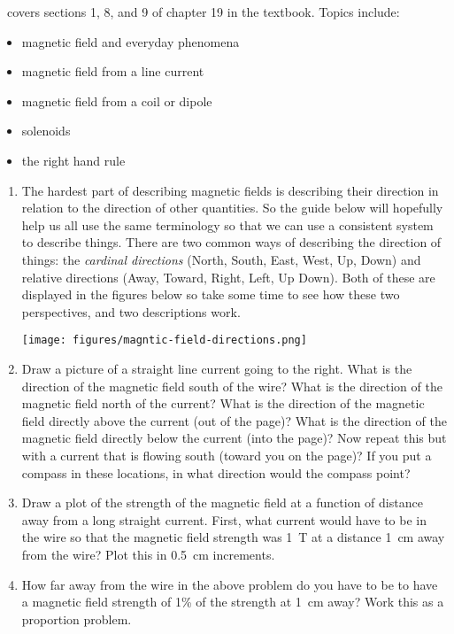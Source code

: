 \week \ covers sections 1, 8, and 9 of chapter 19 in the textbook. Topics include:

\begin{itemize}
	\item magnetic field and everyday phenomena
	\item magnetic field from a line current
	\item magnetic field from a coil or dipole
	\item solenoids
	\item the right hand rule
\end{itemize}

\begin{enumerate}
\setlength\itemsep{3 in}

\item
The hardest part of describing magnetic fields is describing their direction in relation to the direction of other quantities. So the guide below will hopefully help us all use the same terminology so that we can use a consistent system to describe things. There are two common ways of describing the direction of things: the \emph{cardinal directions} (North, South, East, West, Up, Down) and relative directions (Away, Toward, Right, Left, Up Down). Both of these are displayed in the figures below so take some time to see how these two perspectives, and two descriptions work.

\texttt{[image: figures/magntic-field-directions.png]}

\item
Draw a picture of a straight line current going to the right. What is the direction of the magnetic field south of the wire? What is the direction of the magnetic field north of the current? What is the direction of the magnetic field directly above the current (out of the page)? What is the direction of the magnetic field directly below the current (into the page)? Now repeat this but with a current that is flowing south (toward you on the page)? If you put a compass in these locations, in what direction would the compass point? \hugeskip

\item
Draw a plot of the strength of the magnetic field at a function of distance away from a  long straight current. First, what current would have to be in the wire so that the magnetic field strength was \SI{1}{\tesla} at a distance \SI{1}{cm} away from the wire? Plot this in \SI{0.5}{cm} increments.

\item
How far away from the wire in the above problem do you have to be to have a magnetic field strength of 1\% of the strength at \SI{1}{cm} away? Work this as a proportion problem.


\end{enumerate}
